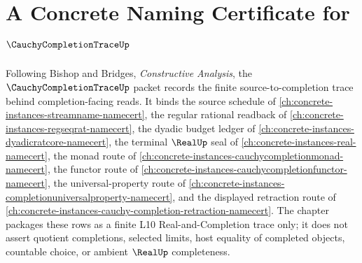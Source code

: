 \chapter{A Concrete Naming Certificate for $\CauchyCompletionTraceUp$}
\label{ch:concrete-instances-cauchy-completion-trace-namecert}

Following Bishop and Bridges, \emph{Constructive Analysis}, the $\CauchyCompletionTraceUp$ packet records the finite source-to-completion trace behind completion-facing reads. It binds the source schedule of \autoref{ch:concrete-instances-streamname-namecert}, the regular rational readback of \autoref{ch:concrete-instances-regseqrat-namecert}, the dyadic budget ledger of \autoref{ch:concrete-instances-dyadicratcore-namecert}, the terminal $\RealUp$ seal of \autoref{ch:concrete-instances-real-namecert}, the monad route of \autoref{ch:concrete-instances-cauchycompletionmonad-namecert}, the functor route of \autoref{ch:concrete-instances-cauchycompletionfunctor-namecert}, the universal-property route of \autoref{ch:concrete-instances-completionuniversalproperty-namecert}, and the displayed retraction route of \autoref{ch:concrete-instances-cauchy-completion-retraction-namecert}. The chapter packages these rows as a finite L10 Real-and-Completion trace only; it does not assert quotient completions, selected limits, host equality of completed objects, countable choice, or ambient $\RealUp$ completeness.

